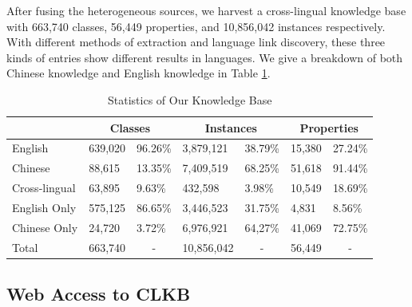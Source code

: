 \documentclass[runningheads,a4paper]{llncs}
\begin{document}
After fusing the heterogeneous sources, we harvest a cross-lingual knowledge base with 663,740 classes, 56,449 properties, and 10,856,042 instances respectively. With different methods of extraction and language link discovery, these three kinds of entries show different results in languages. We give a breakdown of both Chinese knowledge and English knowledge in Table \ref{tab:kb-result}.
\vspace{-0.5cm}
\begin{table}[ht]
\small
\centering
\caption{Statistics of Our Knowledge Base}
\label{tab:kb-result}
\begin{tabular}{|p{2cm}|p{1.5cm}|p{1.5cm}|p{1.5cm}|p{1.5cm}|p{1.5cm}|p{1.5cm}|}
\hline
\multicolumn{1}{|c|}{} & \multicolumn{2}{c|}{Classes}     & \multicolumn{2}{c|}{Instances}                   & \multicolumn{2}{c|}{Properties}    \\ \hline
English                & 639,020 & 96.26\%                & 3,879,121              & 38.79\%                & 15,380  & 27.24\%                \\ \hline
Chinese                & 88,615  & 13.35\%                & 7,409,519              & 68.25\%                & 51,618  & 91.44\%                \\ \hline
Cross-lingual          & 63,895  & 9.63\%                 & 432,598                & 3.98\%                 & 10,549  & 18.69\%                \\ \hline
English Only           & 575,125 & 86.65\%                & 3,446,523              & 31.75\%                & 4,831   & 8.56\%    \\ \hline
Chinese Only           & 24,720  & 3.72\%                 & 6,976,921              & 64,27\%                & 41,069  & 72.75\%   \\ \hline
Total                  & 663,740 & \multicolumn{1}{c|}{-} & 10,856,042             & \multicolumn{1}{c|}{-} & 56,449  & \multicolumn{1}{c|}{-} \\ \hline
\end{tabular}
\end{table}
\vspace{-0.5cm}

\subsection{Web Access to CLKB}
\end{document}
